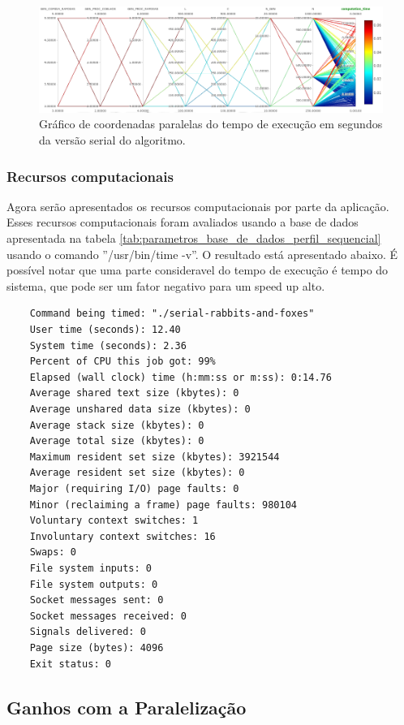 \documentclass[12pt]{article}
\begin{document}
\begin{figure}[H]
	\begin{center}
		\includegraphics[width=1.0\linewidth]{./parallel_coordinates.png}
	\end{center}
	\caption{Gráfico de coordenadas paralelas do tempo de execução em segundos da versão serial do algoritmo.}
	\label{fig:parallel_coordinates}
\end{figure}


\subsubsection{Recursos computacionais}

Agora serão apresentados os recursos computacionais por parte da aplicação. Esses recursos computacionais foram avaliados usando a base de dados apresentada na tabela \ref{tab:parametros_base_de_dados_perfil_sequencial} usando o comando ''/usr/bin/time -v''. O resultado está apresentado abaixo. É possível notar que uma parte consideravel do tempo de execução é tempo do sistema, que pode ser um fator negativo para um speed up alto.


	{
		\scriptsize
		\begin{verbatim}
	Command being timed: "./serial-rabbits-and-foxes"
	User time (seconds): 12.40
	System time (seconds): 2.36
	Percent of CPU this job got: 99%
	Elapsed (wall clock) time (h:mm:ss or m:ss): 0:14.76
	Average shared text size (kbytes): 0
	Average unshared data size (kbytes): 0
	Average stack size (kbytes): 0
	Average total size (kbytes): 0
	Maximum resident set size (kbytes): 3921544
	Average resident set size (kbytes): 0
	Major (requiring I/O) page faults: 0
	Minor (reclaiming a frame) page faults: 980104
	Voluntary context switches: 1
	Involuntary context switches: 16
	Swaps: 0
	File system inputs: 0
	File system outputs: 0
	Socket messages sent: 0
	Socket messages received: 0
	Signals delivered: 0
	Page size (bytes): 4096
	Exit status: 0
\end{verbatim}
	}


\subsection{Ganhos com a Paralelização}
\end{document}
